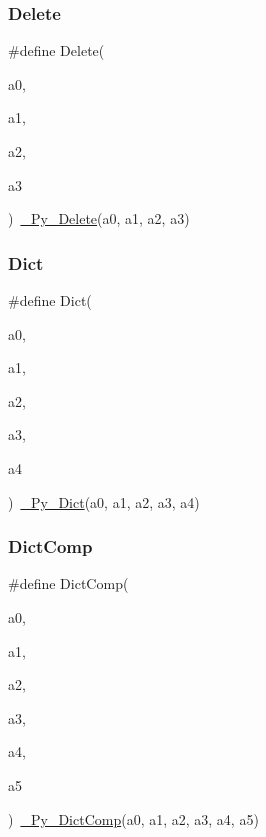\mbox{\label{_python-ast_8h_a7892570e9ff41fd7a083f300e4b81068}} 
\subsubsection{\texorpdfstring{Delete}{Delete}}
{\footnotesize\ttfamily \#define Delete(\begin{DoxyParamCaption}\item[{}]{a0,  }\item[{}]{a1,  }\item[{}]{a2,  }\item[{}]{a3 }\end{DoxyParamCaption})~\mbox{\hyperlink{_python-ast_8h_ad988aab3b2734705a19dcf45a0b98950}{\+\_\+\+Py\+\_\+\+Delete}}(a0, a1, a2, a3)}

\mbox{\label{_python-ast_8h_acab9403d000db48011d6f4bf9fea8b42}} 
\subsubsection{\texorpdfstring{Dict}{Dict}}
{\footnotesize\ttfamily \#define Dict(\begin{DoxyParamCaption}\item[{}]{a0,  }\item[{}]{a1,  }\item[{}]{a2,  }\item[{}]{a3,  }\item[{}]{a4 }\end{DoxyParamCaption})~\mbox{\hyperlink{_python-ast_8h_a9c9d41ca778cf10d746e215dcb75c978}{\+\_\+\+Py\+\_\+\+Dict}}(a0, a1, a2, a3, a4)}

\mbox{\label{_python-ast_8h_ada9dd0cacf4a2576a7f38345eb8a37e9}} 
\subsubsection{\texorpdfstring{DictComp}{DictComp}}
{\footnotesize\ttfamily \#define Dict\+Comp(\begin{DoxyParamCaption}\item[{}]{a0,  }\item[{}]{a1,  }\item[{}]{a2,  }\item[{}]{a3,  }\item[{}]{a4,  }\item[{}]{a5 }\end{DoxyParamCaption})~\mbox{\hyperlink{_python-ast_8h_a221e34772c12c38d3e2b230bf2c20471}{\+\_\+\+Py\+\_\+\+Dict\+Comp}}(a0, a1, a2, a3, a4, a5)}

